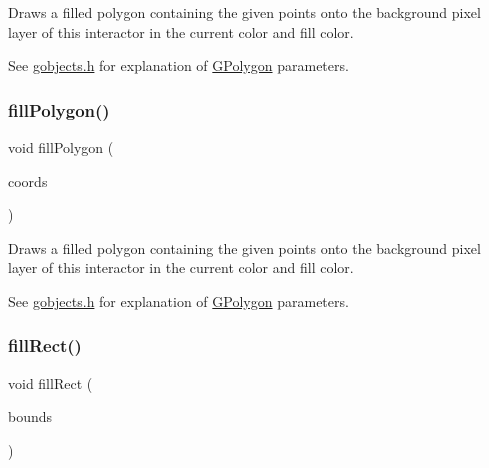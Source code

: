 Draws a filled polygon containing the given points onto the background pixel layer of this interactor in the current color and fill color. 

See \mbox{\hyperlink{gobjects_8h_source}{gobjects.\+h}} for explanation of \mbox{\hyperlink{classsgl_1_1GPolygon}{G\+Polygon}} parameters. \mbox{\label{classsgl_1_1GDrawingSurface_a31822d59786156ebf1cc3b2f7fb70330}} 
\subsubsection{\texorpdfstring{fill\+Polygon()}{fillPolygon()}\hspace{0.1cm}{\footnotesize\ttfamily [2/2]}}
{\footnotesize\ttfamily void fill\+Polygon (\begin{DoxyParamCaption}\item[{std\+::initializer\+\_\+list$<$ \mbox{\hyperlink{structsgl_1_1GPoint}{G\+Point}} $>$}]{coords }\end{DoxyParamCaption})\hspace{0.3cm}{\ttfamily [virtual]}}



Draws a filled polygon containing the given points onto the background pixel layer of this interactor in the current color and fill color. 

See \mbox{\hyperlink{gobjects_8h_source}{gobjects.\+h}} for explanation of \mbox{\hyperlink{classsgl_1_1GPolygon}{G\+Polygon}} parameters. \mbox{\label{classsgl_1_1GDrawingSurface_ae6582295003bf2488836b1993dadbad7}} 
\subsubsection{\texorpdfstring{fill\+Rect()}{fillRect()}\hspace{0.1cm}{\footnotesize\ttfamily [1/2]}}
{\footnotesize\ttfamily void fill\+Rect (\begin{DoxyParamCaption}\item[{const \mbox{\hyperlink{structsgl_1_1GRectangle}{G\+Rectangle}} \&}]{bounds }\end{DoxyParamCaption})\hspace{0.3cm}{\ttfamily [virtual]}}



